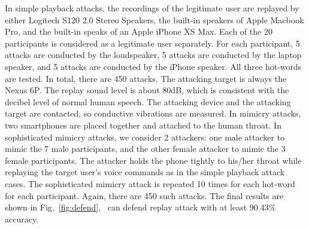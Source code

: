 In simple playback attacks, the recordings of the legitimate user are replayed by either Logitech S120 2.0 Stereo Speakers, the built-in speakers of Apple Macbook Pro, and the built-in speaks of an Apple iPhone XS Max. Each of the 20 participants is considered as a legitimate user separately. For each participant, 5 attacks are conducted by the loudspeaker, 5 attacks are conducted by the laptop speaker, and 5 attacks are conducted by the iPhone speaker. All three hot-words are tested. In total, there are 450 attacks. The attacking target is always the Nexus 6P. The replay sound level is about 80dB, which is consistent with the decibel level of normal human speech. 
The attacking device and the attacking target are contacted, so conductive vibrations are measured. 
In mimicry attacks, two smartphones are placed together and attached to the human throat. In sophisticated mimicry attacks, we consider 2 attackers: one male attacker to mimic the 7 male participants, and the other female attacker to mimic the 3 female participants. The attacker holds the phone tightly to his/her throat while replaying the target user's voice commands as in the simple playback attack cases. The sophisticated mimicry attack is repeated 10 times for each hot-word for each participant. Again, there are 450 such attacks. The final results are shown in Fig.~\ref{fig:defend}, \shortname~can defend replay attack with at least 90.43\% accuracy.

